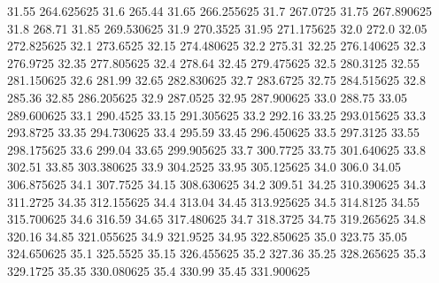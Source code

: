          31.55       264.625625
           31.6           265.44
          31.65       266.255625
           31.7         267.0725
          31.75       267.890625
           31.8           268.71
          31.85       269.530625
           31.9         270.3525
          31.95       271.175625
           32.0            272.0
          32.05       272.825625
           32.1         273.6525
          32.15       274.480625
           32.2           275.31
          32.25       276.140625
           32.3         276.9725
          32.35       277.805625
           32.4           278.64
          32.45       279.475625
           32.5         280.3125
          32.55       281.150625
           32.6           281.99
          32.65       282.830625
           32.7         283.6725
          32.75       284.515625
           32.8           285.36
          32.85       286.205625
           32.9         287.0525
          32.95       287.900625
           33.0           288.75
          33.05       289.600625
           33.1         290.4525
          33.15       291.305625
           33.2           292.16
          33.25       293.015625
           33.3         293.8725
          33.35       294.730625
           33.4           295.59
          33.45       296.450625
           33.5         297.3125
          33.55       298.175625
           33.6           299.04
          33.65       299.905625
           33.7         300.7725
          33.75       301.640625
           33.8           302.51
          33.85       303.380625
           33.9         304.2525
          33.95       305.125625
           34.0            306.0
          34.05       306.875625
           34.1         307.7525
          34.15       308.630625
           34.2           309.51
          34.25       310.390625
           34.3         311.2725
          34.35       312.155625
           34.4           313.04
          34.45       313.925625
           34.5         314.8125
          34.55       315.700625
           34.6           316.59
          34.65       317.480625
           34.7         318.3725
          34.75       319.265625
           34.8           320.16
          34.85       321.055625
           34.9         321.9525
          34.95       322.850625
           35.0           323.75
          35.05       324.650625
           35.1         325.5525
          35.15       326.455625
           35.2           327.36
          35.25       328.265625
           35.3         329.1725
          35.35       330.080625
           35.4           330.99
          35.45       331.900625

